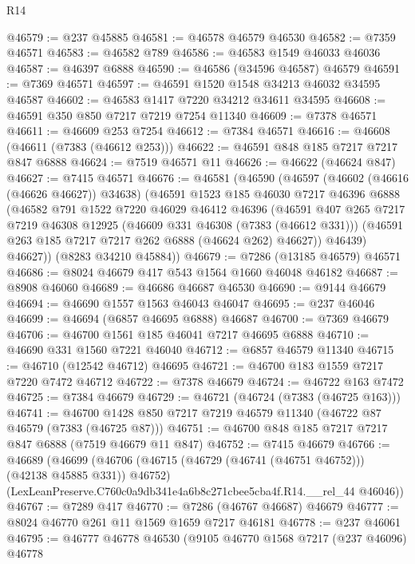 \begin{lexlean}{R14}
\begin{coremodule}
@46579 := @237 @45885
@46581 := @46578 @46579 @46530
@46582 := @7359 @46571
@46583 := @46582 @789
@46586 := @46583 @1549 @46033 @46036
@46587 := @46397 @6888
@46590 := @46586 (@34596 @46587) @46579
@46591 := @7369 @46571
@46597 := @46591 @1520 @1548 @34213 @46032 @34595 @46587
@46602 := @46583 @1417 @7220 @34212 @34611 @34595
@46608 := @46591 @350 @850 @7217 @7219 @7254 @11340
@46609 := @7378 @46571
@46611 := @46609 @253 @7254
@46612 := @7384 @46571
@46616 := @46608 (@46611 (@7383 (@46612 @253)))
@46622 := @46591 @848 @185 @7217 @7217 @847 @6888
@46624 := @7519 @46571 @11
@46626 := @46622 (@46624 @847)
@46627 := @7415 @46571
@46676 := @46581
    (@46590
      (@46597
        (@46602 (@46616 (@46626 @46627)) @34638)
        (@46591
          @1523
          @185
          @46030
          @7217
          @46396
          @6888
          (@46582
            @791
            @1522
            @7220
            @46029
            @46412
            @46396
            (@46591
              @407
              @265
              @7217
              @7219
              @46308
              @12925
              (@46609 @331 @46308 (@7383 (@46612 @331)))
              (@46591 @263 @185 @7217 @7217 @262 @6888 (@46624 @262) @46627))
            @46439)
          @46627))
      (@8283 @34210 @45884))
@46679 := @7286 (@13185 @46579) @46571
@46686 := @8024 @46679 @417 @543 @1564 @1660 @46048 @46182
@46687 := @8908 @46060
@46689 := @46686 @46687 @46530
@46690 := @9144 @46679
@46694 := @46690 @1557 @1563 @46043 @46047
@46695 := @237 @46046
@46699 := @46694 (@6857 @46695 @6888) @46687
@46700 := @7369 @46679
@46706 := @46700 @1561 @185 @46041 @7217 @46695 @6888
@46710 := @46690 @331 @1560 @7221 @46040
@46712 := @6857 @46579 @11340
@46715 := @46710 (@12542 @46712) @46695
@46721 := @46700 @183 @1559 @7217 @7220 @7472 @46712
@46722 := @7378 @46679
@46724 := @46722 @163 @7472
@46725 := @7384 @46679
@46729 := @46721 (@46724 (@7383 (@46725 @163)))
@46741 := @46700 @1428 @850 @7217 @7219 @46579 @11340 (@46722 @87 @46579 (@7383 (@46725 @87)))
@46751 := @46700 @848 @185 @7217 @7217 @847 @6888 (@7519 @46679 @11 @847)
@46752 := @7415 @46679
@46766 := @46689
    (@46699
      (@46706 (@46715 (@46729 (@46741 (@46751 @46752))) (@42138 @45885 @331)) @46752)
      (LexLeanPreserve.C760c0a9db341e4a6b8c271cbee5cba4f.R14.__rel_44 @46046))
@46767 := @7289 @417
@46770 := @7286 (@46767 @46687) @46679
@46777 := @8024 @46770 @261 @11 @1569 @1659 @7217 @46181
@46778 := @237 @46061
@46795 := @46777
    @46778
    @46530
    (@9105
      @46770
      @1568
      @7217
      (@237 @46096)
      @46778

\end{coremodule}
\end{lexlean}
